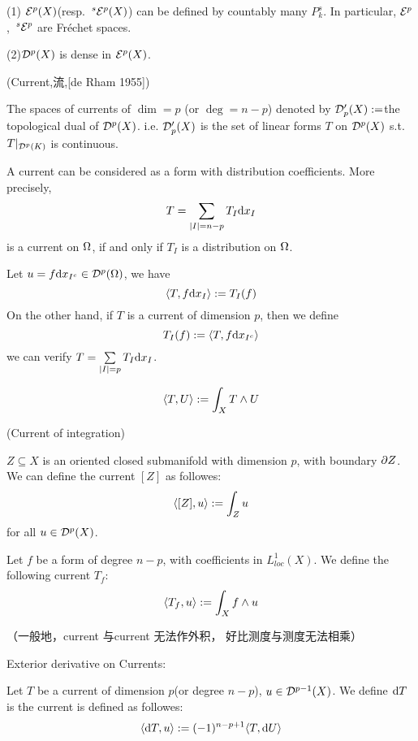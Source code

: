 \begin{rem}
(1) $\mathcal{E}^p(X)$(resp. $\,^s\mathcal{E}^p(X)$)
can be defined by countably many $P^s_k$.
In particular, $\mathcal{E}^p$, $\,^s\mathcal{E}^p$ are 
Fr\'{e}chet spaces.

(2)$\mathcal{D}^p(X)$ is dense in $\mathcal{E}^p(X)$.
\end{rem}

\begin{definition}(Current,流,[de Rham 1955])

The spaces of currents of $\dim=p$ (or $\deg=n-p$)
denoted by $\mathcal{D}'_p(X):=$the topological dual of $\mathcal{D}^p(X)$.
i.e. $\mathcal{D}'_p(X)$ is the set of linear forms $T$ on $\mathcal{D}^p(X)$
s.t. $T|_{\mathcal{D}^p(K)}$ is continuous.
\end{definition}

\begin{rem}
A current can be considered as a form with 
distribution coefficients.
More precisely,
$$
  T=\sum_{|I|=n-p}
    T_I\mathrm{d} x_I
$$
is a current on $\Omega$, if and only if $T_I$
is a distribution on $\Omega$.
\end{rem}

Let $u=f\mathrm{d} x_{I^c}
\in\mathcal{D}^p(\Omega)$, we have
$$
  \langle T,f\mathrm{d} x_I \rangle
:=T_I(f)
$$
On the other hand, if $T$ is a current of dimension $p$,
then we define 
$$
  T_I(f):=\langle T,f\mathrm{d} x_{I^c} \rangle
$$
we can verify $T=\sum\limits_{|I|=p}T_I\mathrm{d} x_I$.

\begin{notation}
$$
  \langle T,U \rangle
:=
  \int_XT\wedge U
$$
\end{notation}

\begin{example}(Current of integration)

$Z\subseteq X$ is an oriented closed submanifold with
dimension $p$, with boundary $\partial Z$. We can define the current
$[Z]$ as followes:
$$\langle [Z],u \rangle:=\int_Zu$$
for all $u\in\mathcal{D}^p(X)$.
\end{example}

\begin{example}
Let $f$ be a form of degree $n-p$, with 
coefficients in $L^1_{loc}(X)$. We define the following current $T_f$:
$$
  \langle T_f,u \rangle
:=
  \int_Xf\wedge u
$$
\end{example}

（一般地，current 与current 无法作外积，
好比测度与测度无法相乘）

Exterior derivative on Currents:

\begin{definition}
Let $T$ be a current of dimension $p$(or degree $n-p$),
$u\in\mathcal{D}^{p-1}(X)$. We define $\mathrm{d} T$ is the 
current is defined as followes:
$$
  \langle \mathrm{d} T,u \rangle
:=
  (-1)^{n-p+1}
  \langle T,\mathrm{d} U \rangle
$$
\end{definition}

